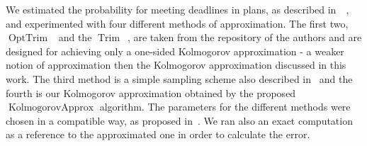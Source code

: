 \documentclass{article}
\DeclareMathOperator{\Trim}{Trim}
\DeclareMathOperator{\KlmApprox}{KolmogorovApprox}
\DeclareMathOperator{\OptTrim}{OptTrim}
\begin{document}
	
	We estimated the probability for meeting deadlines in plans, as described in~~\cite{cohen2015estimating,CohenGW18}, and experimented with four different methods of approximation. The first two, $\OptTrim$~\cite{CohenGW18} and the $\Trim$~\cite{cohen2015estimating}, are taken from the repository of the authors and are designed for achieving only a one-sided Kolmogorov approximation - a  weaker notion of approximation then the Kolmogorov approximation discussed in this work. The third method is a simple sampling scheme also described in~\cite{cohen2015estimating} and the fourth is our Kolmogorov approximation obtained by the proposed $\KlmApprox$ algorithm. The parameters for the different methods were chosen in a compatible way, as proposed in~\cite{CohenGW18}. We ran also an exact computation as a reference to the approximated one in order to calculate the error. 
	
\end{document}
